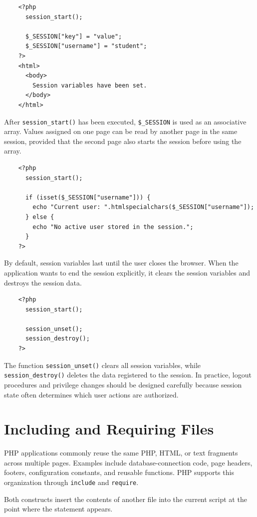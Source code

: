 \documentclass{scrbook}
\begin{document}
	\begin{lstlisting}
	<?php
	  session_start();
		
	  $_SESSION["key"] = "value";
	  $_SESSION["username"] = "student";
	?>
	<html>
	  <body>
		Session variables have been set.
	  </body>
	</html>
	\end{lstlisting}
	
	After \texttt{session\_start()} has been executed, \texttt{\$\_SESSION} is used as an associative array. Values assigned on one page can be read by another page in the same session, provided that the second page also starts the session before using the array.
	
	\begin{lstlisting}
	<?php
	  session_start();
		
	  if (isset($_SESSION["username"])) {
		echo "Current user: ".htmlspecialchars($_SESSION["username"]);
	  } else {
		echo "No active user stored in the session.";
	  }
	?>
	\end{lstlisting}
	
	By default, session variables last until the user closes the browser. When the application wants to end the session explicitly, it clears the session variables and destroys the session data.
	
	\begin{lstlisting}
	<?php
	  session_start();
	
	  session_unset();
	  session_destroy();
	?>
	\end{lstlisting}
	
	The function \texttt{session\_unset()} clears all session variables, while \texttt{session\_destroy()} deletes the data registered to the session. In practice, logout procedures and privilege changes should be designed carefully because session state often determines which user actions are authorized.
	
	\section{Including and Requiring Files}
	
	PHP applications commonly reuse the same PHP, HTML, or text fragments across multiple pages. Examples include database-connection code, page headers, footers, configuration constants, and reusable functions. PHP supports this organization through \texttt{include} and \texttt{require}.
	
	Both constructs insert the contents of another file into the current script at the point where the statement appears.
	
\end{document}
